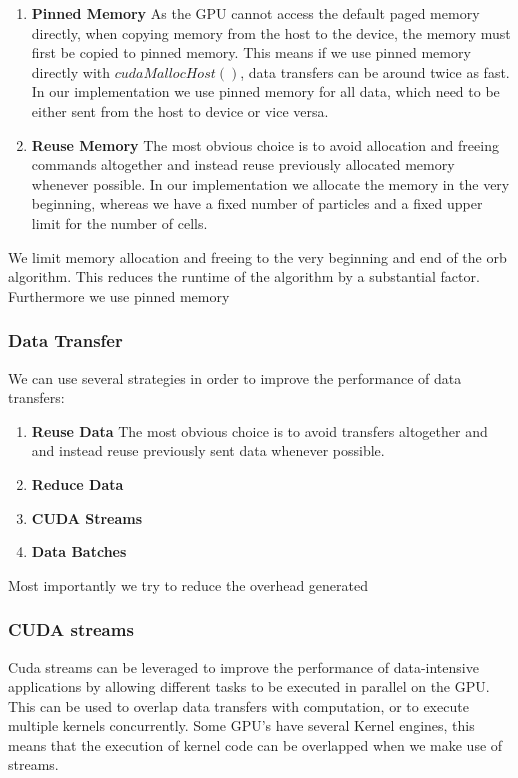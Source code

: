 \documentclass[]{article}
\begin{document}
\begin{enumerate}
	\item \textbf{Pinned Memory} As the GPU cannot access the default paged memory directly, when copying memory from the host to the device, the memory must first be copied to pinned memory. This means if we use pinned memory directly with $cudaMallocHost()$, data transfers can be around twice as fast. In our implementation we use pinned memory for all data, which need to be either sent from the host to device or vice versa.
	\item \textbf{Reuse Memory} The most obvious choice is to avoid allocation and freeing commands altogether and instead reuse previously allocated memory whenever possible. In our implementation we allocate the memory in the very beginning, whereas we have a fixed number of particles and a fixed upper limit for the number of cells. 
	
\end{enumerate}

We limit memory allocation and freeing to the very beginning and end of the orb algorithm. This reduces the runtime of the algorithm by a substantial factor. Furthermore we use pinned memory

\subsubsection{Data Transfer}

We can use several strategies in order to improve the performance of data transfers: 

\begin{enumerate}
	\item \textbf{Reuse Data} The most obvious choice is to avoid transfers altogether and and instead reuse previously sent data whenever possible. 
	\item \textbf{Reduce Data} 
	\item \textbf{CUDA Streams} 
	\item \textbf{Data Batches}
	
\end{enumerate}

Most importantly we try to reduce the overhead generated 

\subsubsection{CUDA streams}

Cuda streams can be leveraged to improve the performance of data-intensive applications by allowing different tasks to be executed in parallel on the GPU. This can be used to overlap data transfers with computation, or to execute multiple kernels concurrently. Some GPU's have several Kernel engines, this means that the execution of kernel code can be overlapped when we make use of streams.
\end{document}
